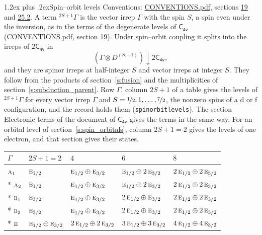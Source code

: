 \documentclass[10pt,a4paper]{article}
\makeatletter
\renewcommand\section{\@startsection{section}{1}{\z@}{-3ex plus -1ex minus -.2ex}%
  {1.2ex plus .2ex}{\normalfont\large\sffamily\bfseries\color{parttitle}}}
\numberwithin{equation}{section}
\newcommand{\grp}[1]{\mathsf{#1}}
\newcommand{\irr}[1]{\text{\normalfont\scshape #1}}
\newcommand{\restr}[2]{#1\!\downarrow#2}
\newcommand{\irrJp}[2]{D^{(#1,#2)}}
\newcommand{\irrprod}{\otimes}
\newcommand{\term}[2]{{}^{#1}#2}
\makeatother
\begin{document}
\section{Spin--orbit levels}\label{s:spin_orbit}
Conventions: \href{../../CONVENTIONS.pdf}{CONVENTIONS.pdf}, sections \href{../../../rotation/CONVENTIONS.pdf\#conv.19}{19} and \href{../../CONVENTIONS.pdf\#conv.25.2}{25.2}.
\leavevmode\label{n:local.spin}\label{n:symbol.term}A term $\term{2S+1}{\Gamma}$ is the vector irrep $\Gamma$ with the spin $S$, a spin even under the inversion, as in the terms of the degenerate levels of \href{../../../rotation/data/pdf/C4v.pdf}{$\grp{C_{4v}}$} (\href{../../CONVENTIONS.pdf}{CONVENTIONS.pdf}, section \href{../../../rotation/CONVENTIONS.pdf\#conv.19}{19}). Under spin--orbit coupling it splits into the irreps of $\grp{2C_{4v}}$ in
\begin{equation}\label{e:spinorbit}\restr{(\Gamma \irrprod \irrJp{S}{+1})}{\grp{2C_{4v}}},\end{equation}
and they are spinor irreps at half-integer $S$ and vector irreps at integer $S$. They follow from the products of section~\ref{s:fusion} and the multiplicities of section~\ref{s:subduction_parent}. Row $\Gamma$, column $2S + 1$ of a table gives the levels of $\term{2S+1}{\Gamma}$ for every vector irrep $\Gamma$ and $S = \nicefrac{1}{2}, 1, \dots, \nicefrac{7}{2}$, the nonzero spins of a d or f configuration, and the record holds them (\texttt{spinorbitlevels}). The section Electronic terms of the document of \href{../../../rotation/data/pdf/C4v.pdf}{$\grp{C_{4v}}$} gives the terms in the same way. For an orbital level of section~\ref{s:spin_orbitals}, column $2S + 1 = 2$ gives the levels of one electron, and that section gives their states.
{\small\setlength{\tabcolsep}{3pt}\begin{longtable}{@{}lllll@{}}\toprule
$\Gamma$ & $2S + 1 = 2$ & $4$ & $6$ & $8$\\\midrule\endhead
\bottomrule\endfoot\endlastfoot
$\irr{a}_{1}$ & $\irr{e}_{1/2}$ & $\irr{e}_{1/2}\oplus \irr{e}_{3/2}$ & $\irr{e}_{1/2}\oplus 2\,\irr{e}_{3/2}$ & $2\,\irr{e}_{1/2}\oplus 2\,\irr{e}_{3/2}$\\*
$\irr{a}_{2}$ & $\irr{e}_{1/2}$ & $\irr{e}_{1/2}\oplus \irr{e}_{3/2}$ & $\irr{e}_{1/2}\oplus 2\,\irr{e}_{3/2}$ & $2\,\irr{e}_{1/2}\oplus 2\,\irr{e}_{3/2}$\\*
$\irr{b}_{1}$ & $\irr{e}_{3/2}$ & $\irr{e}_{1/2}\oplus \irr{e}_{3/2}$ & $2\,\irr{e}_{1/2}\oplus \irr{e}_{3/2}$ & $2\,\irr{e}_{1/2}\oplus 2\,\irr{e}_{3/2}$\\*
$\irr{b}_{2}$ & $\irr{e}_{3/2}$ & $\irr{e}_{1/2}\oplus \irr{e}_{3/2}$ & $2\,\irr{e}_{1/2}\oplus \irr{e}_{3/2}$ & $2\,\irr{e}_{1/2}\oplus 2\,\irr{e}_{3/2}$\\*
$\irr{e}$ & $\irr{e}_{1/2}\oplus \irr{e}_{3/2}$ & $2\,\irr{e}_{1/2}\oplus 2\,\irr{e}_{3/2}$ & $3\,\irr{e}_{1/2}\oplus 3\,\irr{e}_{3/2}$ & $4\,\irr{e}_{1/2}\oplus 4\,\irr{e}_{3/2}$\\
\bottomrule\end{longtable}}
\end{document}
